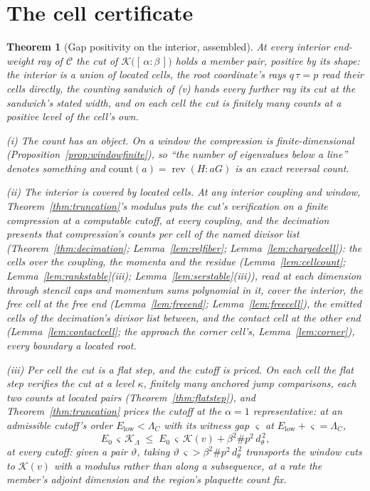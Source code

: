 \documentclass[11pt]{article}
\newtheorem{theorem}{Theorem}
\theoremstyle{definition}
\begin{document}
\section{The cell certificate}

\begin{theorem}[Gap positivity on the interior, assembled]\label{thm:gappos}
At every interior end-weight ray of $\mathcal C$ the cut of
$\mathcal K\big([\,\alpha:\beta\,]\big)$ holds a member pair,
positive by its shape: the interior is a union of
located cells, the root coordinate's rays $q\,\tau=p$ read their
cells directly, the counting sandwich of (v) hands every further ray
its cut at the sandwich's stated width, and on each cell the cut is
finitely many counts at a positive level of the cell's own.

\emph{(i) The count has an object.} On a window the compression is
finite-dimensional (Proposition~\ref{prop:windowfinite}), so ``the number of
eigenvalues below a line'' denotes something and
$\mathrm{count}(a)=\operatorname{rev}(H\!:\!aG)$ is an exact reversal count.

\emph{(ii) The interior is covered by located cells.} At any interior
coupling and window, Theorem~\ref{thm:truncation}'s modulus puts the
cut's verification on a finite compression at a computable cutoff, at
every coupling, and the decimation presents that compression's counts
per cell of the named divisor list (Theorem~\ref{thm:decimation};
Lemma~\ref{lem:relfiber}; Lemma~\ref{lem:chargedcell}): the cells over
the coupling, the momenta and the residue
(Lemma~\ref{lem:cellcount}; Lemma~\ref{lem:rankstable}(iii);
Lemma~\ref{lem:serstable}(iii)), read at
each dimension through stencil caps and momentum sums polynomial in it,
cover the interior, the \emph{free cell} at the free end
(Lemma~\ref{lem:freeend}; Lemma~\ref{lem:freecell}), the \emph{emitted
cells} of the decimation's divisor list between, and the \emph{contact cell}
at the other end (Lemma~\ref{lem:contactcell}; the approach the
corner cell's, Lemma~\ref{lem:corner}), every boundary a
located root.

\emph{(iii) Per cell the cut is a flat step, and the cutoff is priced.}
On each cell the flat step verifies the cut at a level $\kappa$,
finitely many anchored jump comparisons, each two counts at located
pairs (Theorem~\ref{thm:flatstep}), and
Theorem~\ref{thm:truncation} prices the cutoff at the $\alpha{=}1$
representative: at an admissible cutoff's order
$E_{\mathrm{low}}<\Lambda_C$ with its witness gap $\varsigma$ at
$E_{\mathrm{low}}+\varsigma=\Lambda_C$,
\[
E_0\,\varsigma\,\mathcal K_\Lambda
\;\le\;E_0\,\varsigma\,\mathcal K(v)+\beta^2\#p^2\,d_\theta^{\,2} ,
\]
at every cutoff: given a pair $\vartheta$, taking
$\vartheta\,\varsigma>\beta^2\#p^2\,d_\theta^{\,2}$ transports the
window cuts to $\mathcal K(v)$ with a modulus rather than along a
subsequence, at a rate the member's adjoint dimension and the
region's plaquette count fix.


\end{theorem}
\end{document}
